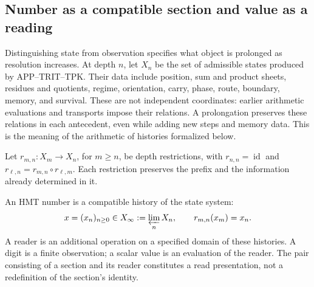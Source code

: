 
\subsection{Number as a compatible section and value as a reading}
\label{hist:seccion}

Distinguishing state from observation specifies what object is prolonged
as resolution increases. At depth \(n\), let \(X_n\) be the set of
admissible states produced by APP--TRIT--TPK. Their data include position,
sum and product sheets, residues and quotients, regime, orientation,
carry, phase, route, boundary, memory, and survival. These are not
independent coordinates: earlier arithmetic evaluations and transports
impose their relations. A prolongation preserves these relations in
each antecedent, even while adding new steps and memory data.
This is the meaning of the arithmetic of histories formalized below.

Let \(r_{m,n}:X_m\to X_n\), for \(m\geq n\), be depth
restrictions, with \(r_{n,n}=\operatorname{id}\) and
\(r_{\ell,n}=r_{m,n}\circ r_{\ell,m}\). Each restriction preserves
the prefix and the information already determined in it.

\begin{definition}
An HMT number is a compatible history of the state system:
\begin{equation}
 x=(x_n)_{n\geq0}\in X_\infty:=\varprojlim_n X_n,
 \qquad r_{m,n}(x_m)=x_n.
 \label{hist:limite-inverso}
\end{equation}
A reader is an additional operation on a specified domain of these
histories. A digit is a finite observation; a scalar value is an evaluation
of the reader. The pair consisting of a section and its reader constitutes
a read presentation, not a redefinition of the section's identity.
\end{definition}

